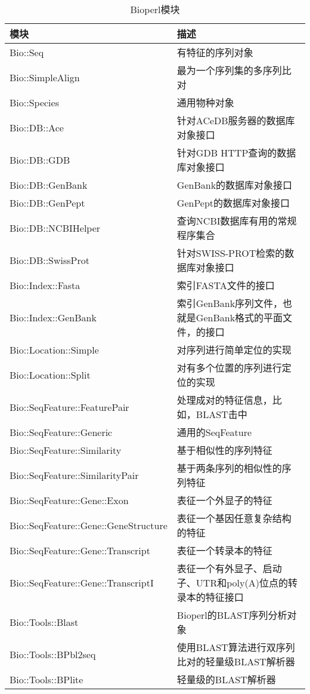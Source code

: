 \begin{table}[!htbp]
  \begin{center}
  \caption{Bioperl模块}
  \label{tab:table12.1}
  \begin{tabu}{X[2,l]X[3,l]}
  \toprule
  模块 & 描述\\
  \midrule
  Bio::Seq & 有特征的序列对象\\
  Bio::SimpleAlign & 最为一个序列集的多序列比对\\
  Bio::Species & 通用物种对象\\
  Bio::DB::Ace & 针对ACeDB服务器的数据库对象接口\\
  Bio::DB::GDB & 针对GDB HTTP查询的数据库对象接口\\
  Bio::DB::GenBank & GenBank的数据库对象接口\\
  Bio::DB::GenPept & GenPept的数据库对象接口\\
  Bio::DB::NCBIHelper & 查询NCBI数据库有用的常规程序集合\\
  Bio::DB::SwissProt & 针对SWISS-PROT检索的数据库对象接口\\
  Bio::Index::Fasta & 索引FASTA文件的接口\\
  Bio::Index::GenBank & 索引GenBank序列文件，也就是GenBank格式的平面文件，的接口\\
  Bio::Location::Simple & 对序列进行简单定位的实现\\
  Bio::Location::Split & 对有多个位置的序列进行定位的实现\\
  Bio::SeqFeature::FeaturePair & 处理成对的特征信息，比如，BLAST击中\\
  Bio::SeqFeature::Generic & 通用的SeqFeature\\
  Bio::SeqFeature::Similarity & 基于相似性的序列特征\\
  Bio::SeqFeature::SimilarityPair & 基于两条序列的相似性的序列特征\\
  Bio::SeqFeature::Gene::Exon & 表征一个外显子的特征\\
  Bio::SeqFeature::Gene::GeneStructure & 表征一个基因任意复杂结构的特征\\
  Bio::SeqFeature::Gene::Transcript & 表征一个转录本的特征\\
  Bio::SeqFeature::Gene::TranscriptI & 表征一个有外显子、启动子、UTR和poly(A)位点的转录本的特征接口\\
  Bio::Tools::Blast & Bioperl的BLAST序列分析对象\\
  Bio::Tools::BPbl2seq & 使用BLAST算法进行双序列比对的轻量级BLAST解析器\\
  Bio::Tools::BPlite & 轻量级的BLAST解析器\\

\end{tabu}
\end{center}
\end{table}

